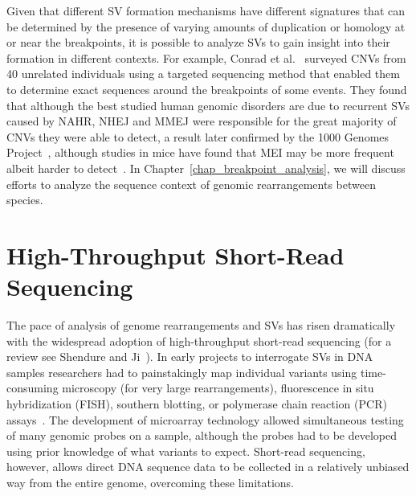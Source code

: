 Given that different SV formation mechanisms have different signatures that can be determined by the presence of varying amounts of duplication or homology at or near the breakpoints, it is possible to analyze SVs to gain insight into their formation in different contexts. For example, Conrad et al.~\cite{Conrad:2010if} surveyed CNVs from 40 unrelated individuals using a targeted sequencing method that enabled them to determine exact sequences around the breakpoints of some events. They found that although the best studied human genomic disorders are due to recurrent SVs caused by NAHR, NHEJ and MMEJ were responsible for the great majority of CNVs they were able to detect, a result later confirmed by the 1000 Genomes Project~\cite{Mills:2011p1611}, although studies in mice have found that MEI may be more frequent albeit harder to detect~\cite{Yalcin:2011tm}.  In Chapter~\ref{chap_breakpoint_analysis}, we will discuss efforts to analyze the sequence context of genomic rearrangements between species.

\section{High-Throughput Short-Read Sequencing}

The pace of analysis of genome rearrangements and SVs has risen dramatically with the widespread adoption of high-throughput short-read sequencing (for a review see Shendure and Ji~\cite{Shendure:2008jh}). In early projects to interrogate SVs in DNA samples researchers had to painstakingly map individual variants using time-consuming microscopy (for very large rearrangements), fluorescence in situ hybridization (FISH), southern blotting, or polymerase chain reaction (PCR) assays~\cite{Aten:2008dh}. The development of microarray technology allowed simultaneous testing of many genomic probes on a sample, although the probes had to be developed using prior knowledge of what variants to expect. Short-read sequencing, however, allows direct DNA sequence data to be collected in a relatively unbiased way from the entire genome, overcoming these limitations.

